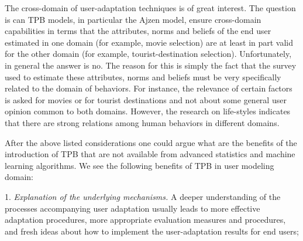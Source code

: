 \documentclass{llncs}
\begin{document}
\vspace{0.6em}
 The cross-domain of user-adaptation techniques is of great interest. The question is can TPB models, in particular the Ajzen model, ensure cross-domain capabilities in terms that the attributes, norms and beliefs of the end user estimated in one domain (for example, movie selection) are at least in part valid for the other domain (for example, tourist-destination selection). Unfortunately, in general the answer is no. The reason for this is simply the fact that the survey used to estimate these attributes, norms and beliefs must be very specifically related to the domain of behaviors. For instance, the relevance of certain factors is asked for movies or for tourist destinations and not about some general user opinion common to both domains. However, the research on life-styles %
\cite{Dewberry2013} indicates that there are strong relations among human behaviors in different domains.


\vspace{0.6em}
 After the above listed considerations one could argue what are the benefits of the introduction of TPB that are not available from advanced statistics and machine learning algorithms. We see the following benefits of TPB in user modeling domain:

1. {\it Explanation of the underlying mechanisms.} A deeper understanding of the processes accompanying user adaptation usually leads to more effective adaptation procedures, more appropriate evaluation measures and procedures, and fresh ideas about how to implement the user-adaptation results for end users; 
\end{document}
